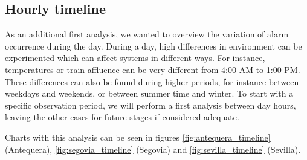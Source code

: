 \documentclass[a4paper,12pt]{article}
\begin{document}
\subsection{Hourly timeline}
As an additional first analysis, we wanted to overview the variation of alarm occurrence during the day. During a day, high differences in environment can be experimented which can affect systems in different ways. For instance, temperatures or train affluence can be very different from 4:00 AM to 1:00 PM. These differences can also be found during higher periods, for instance between weekdays and weekends, or between summer time and winter. To start with a specific observation period, we will perform a first analysis between day hours, leaving the other cases for future stages if considered adequate.

Charts with this analysis can be seen in figures \ref{fig:antequera_timeline} (Antequera), \ref{fig:segovia_timeline} (Segovia) and \ref{fig:sevilla_timeline} (Sevilla).
\end{document}
